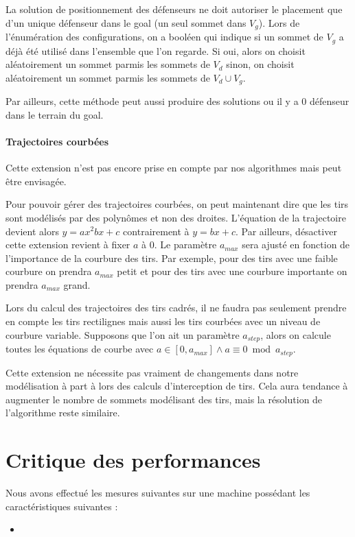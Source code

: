 \documentclass[12pt]{article}
\begin{document}
La solution de positionnement des défenseurs ne doit autoriser le placement que d'un unique défenseur dans le goal (un seul sommet dans $V_g$).
Lors de l'énumération des configurations, on a booléen qui indique si un sommet de $V_g$ a déjà été utilisé dans l'ensemble que l'on regarde. Si oui, alors on choisit aléatoirement un sommet parmis les sommets de $V_d$ sinon, on choisit aléatoirement un sommet parmis les sommets de $V_d \cup V_g$.

Par ailleurs, cette méthode peut aussi produire des solutions ou il y a 0 défenseur dans le terrain du goal.

\paragraph{Trajectoires courbées}
Cette extension n'est pas encore prise en compte par nos algorithmes mais peut être envisagée.

Pour pouvoir gérer des trajectoires courbées, on peut maintenant dire que les tirs sont modélisés par des polynômes et non des droites. L'équation de la trajectoire devient alors $y = ax^2 bx + c$ contrairement à $y = bx+c$. Par ailleurs, désactiver cette extension revient à fixer $a$ à 0. Le paramètre $a_{max}$ sera ajusté en fonction de l'importance de la courbure des tirs. Par exemple, pour des tirs avec une faible courbure on prendra $a_{max}$ petit et pour des tirs avec une courbure importante on prendra $a_{max}$ grand.

Lors du calcul des trajectoires des tirs cadrés, il ne faudra pas seulement prendre en compte les tirs rectilignes mais aussi les tirs courbées avec un niveau de courbure variable. Supposons que l'on ait un paramètre $a_{step}$, alors on calcule toutes les équations de courbe avec $a \in [0, a_{max}] \wedge a \equiv 0 \bmod a_{step}$.

Cette extension ne nécessite pas vraiment de changements dans notre modélisation à part à lors des calculs d'interception de tirs. Cela aura tendance à augmenter le nombre de sommets modélisant des tirs, mais la résolution de l'algorithme reste similaire.

\section{Critique des performances}

Nous avons effectué les mesures suivantes sur une machine possédant les caractéristiques suivantes :

\begin{itemize}
  \item %
\end{itemize}
\end{document}
